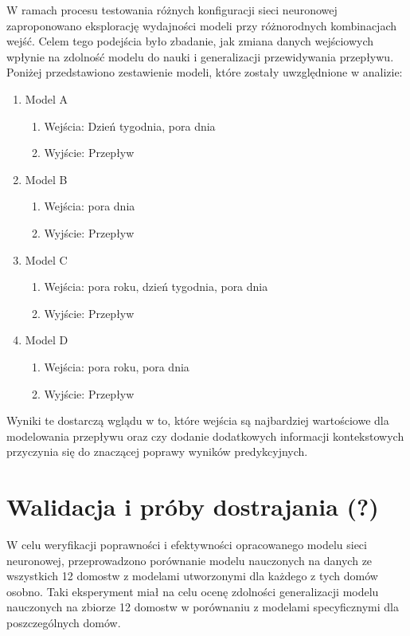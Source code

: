 \documentclass[a4paper,twoside,12pt]{book}
\begin{document}
W ramach procesu testowania różnych konfiguracji sieci neuronowej zaproponowano eksplorację wydajności modeli przy różnorodnych kombinacjach wejść. Celem tego podejścia było zbadanie, jak zmiana danych wejściowych wpłynie na zdolność modelu do nauki i generalizacji przewidywania przepływu. Poniżej przedstawiono zestawienie modeli, które zostały uwzględnione w analizie:

\begin{enumerate}
	\item Model A
	      \begin{enumerate}
		      \item Wejścia: Dzień tygodnia, pora dnia
		      \item Wyjście: Przepływ
	      \end{enumerate}
	\item Model B
	      \begin{enumerate}
		      \item Wejścia: pora dnia
		      \item Wyjście: Przepływ
	      \end{enumerate}
	\item Model C
	      \begin{enumerate}
		      \item Wejścia: pora roku, dzień tygodnia, pora dnia
		      \item Wyjście: Przepływ
	      \end{enumerate}
	\item Model D
	      \begin{enumerate}
		      \item Wejścia: pora roku, pora dnia
		      \item Wyjście: Przepływ
	      \end{enumerate}
\end{enumerate}

Wyniki te dostarczą wglądu w to, które wejścia są najbardziej wartościowe dla modelowania przepływu oraz czy dodanie dodatkowych informacji kontekstowych przyczynia się do znaczącej poprawy wyników predykcyjnych.
\newpage

\section{Walidacja i próby dostrajania (?)}
W celu weryfikacji poprawności i efektywności opracowanego modelu sieci neuronowej, przeprowadzono porównanie modelu nauczonych na danych ze wszystkich 12 domostw z modelami utworzonymi dla każdego z tych domów osobno. Taki eksperyment miał na celu ocenę zdolności generalizacji modelu nauczonych na zbiorze 12 domostw w porównaniu z modelami specyficznymi dla poszczególnych domów.
\end{document}
